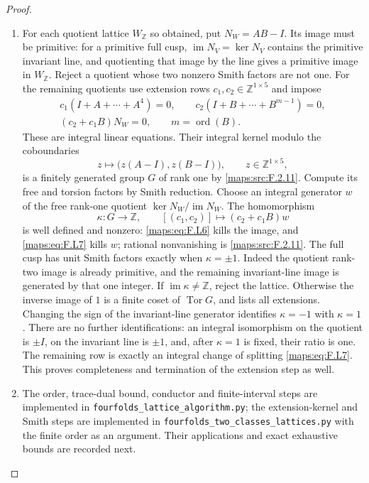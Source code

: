 \begin{proof}
\begin{enumerate}[label=\arabic*.]
\item For each quotient lattice $W_{\mathbb Z}$ so obtained,
put $N_W=AB-I$.
Its image must be primitive: for a primitive full cusp,
$\operatorname{im}N_V=\ker N_V$ contains the primitive
invariant line, and quotienting that image by the line
gives a primitive image in $W_{\mathbb Z}$.
Reject a quotient whose two nonzero Smith factors are
not one.  For the remaining quotients use extension rows
$c_1,c_2\in\mathbb Z^{1\times5}$ and impose
\[
\begin{gathered}
 c_1(I+A+\cdots+A^4)=0,
 \qquad c_2(I+B+\cdots+B^{m-1})=0,\\
 (c_2+c_1B)N_W=0,
 \qquad m=\operatorname{ord}(B).
\end{gathered}
 \tag{F.L6}\label{maps:eq:F.L6}
\]
These are integral linear equations.  Their integral kernel
modulo the coboundaries
\[
 z\longmapsto\bigl(z(A-I),z(B-I)\bigr),
 \qquad z\in\mathbb Z^{1\times5},
 \tag{F.L7}\label{maps:eq:F.L7}
\]
is a finitely generated group $G$ of rank one by \ref{maps:src:F.2.11}.
Compute its free and torsion factors by Smith reduction.
Choose an integral generator $w$ of the free rank-one
quotient $\ker N_W/\operatorname{im}N_W$.
The homomorphism
\[
 \kappa:G\longrightarrow\mathbb Z,
 \qquad [(c_1,c_2)]\longmapsto(c_2+c_1B)w
 \tag{F.L8}\label{maps:eq:F.L8}
\]
is well defined and nonzero: \eqref{maps:eq:F.L6} kills the image, and
\eqref{maps:eq:F.L7} kills $w$; rational nonvanishing is \ref{maps:src:F.2.11}.
The full cusp has unit Smith factors exactly when
$\kappa=\pm1$.
Indeed the quotient rank-two image is already primitive,
and the remaining invariant-line image is generated by
that one integer.
If $\operatorname{im}\kappa\ne\mathbb Z$, reject the
lattice.  Otherwise the inverse image of $1$ is a finite
coset of $\operatorname{Tor}G$, and lists all extensions.
Changing the sign of the invariant-line generator identifies
$\kappa=-1$ with $\kappa=1$.
There are no further identifications: an integral isomorphism
on the quotient is $\pm I$, on the invariant line is
$\pm1$, and, after $\kappa=1$ is fixed, their ratio is one.
The remaining row is exactly an integral change of splitting
\eqref{maps:eq:F.L7}.
This proves completeness and termination of the extension
step as well.

\item The order, trace-dual bound, conductor and finite-interval
steps are implemented in
\texttt{fourfolds\_lattice\_algorithm.py};
the extension-kernel and Smith steps are implemented in
\texttt{fourfolds\_two\_classes\_lattices.py} with the
finite order as an argument.  Their applications and exact
exhaustive bounds are recorded next.

\end{enumerate}
\end{proof}




